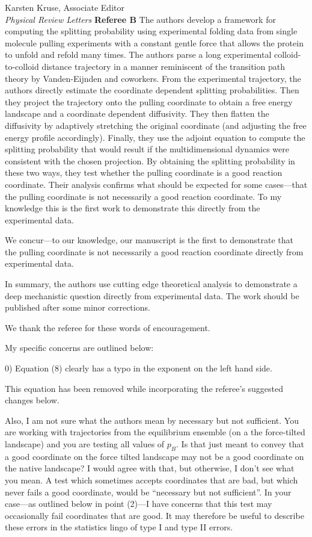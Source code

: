 \documentclass[ucb,qb3,10pt,fullfrom]{ucletter}
\begin{document}
\begin{letter}{Karsten Kruse, Associate Editor\\
\emph{Physical Review Letters}}
\color{magenta}
{\bf Referee B}
The authors develop a framework for computing the splitting
probability using experimental folding data from single molecule
pulling experiments with a constant gentle force that allows the
protein to unfold and refold many times. The authors parse a long
experimental colloid-to-colloid distance trajectory in a manner
reminiscent of the transition path theory by Vanden-Eijnden and
coworkers. From the experimental trajectory, the authors directly
estimate the coordinate dependent splitting probabilities. Then they
project the trajectory onto the pulling coordinate to obtain a free
energy landscape and a coordinate dependent diffusivity. They then
flatten the diffusivity by adaptively stretching the original
coordinate (and adjusting the free energy profile accordingly).
Finally, they use the adjoint equation to compute the splitting
probability that would result if the multidimensional dynamics were
consistent with the chosen projection. By obtaining the splitting
probability in these two ways, they test whether the pulling
coordinate is a good reaction coordinate. Their analysis confirms what
should be expected for some cases---that the pulling coordinate is not
necessarily a good reaction coordinate. To my knowledge this is the
first work to demonstrate this directly from the experimental data. 

\color{black}
We concur---to our knowledge, our manuscript is the first to demonstrate that the pulling coordinate is not necessarily a good reaction coordinate directly from experimental data.

\color{magenta}
In summary, the authors use cutting edge theoretical analysis to
demonstrate a deep mechanistic question directly from experimental
data. The work should be published after some minor corrections. 

\color{black}
We thank the referee for these words of encouragement.

\color{magenta}
My specific concerns are outlined below:

0) Equation (8) clearly has a typo in the exponent on the left hand
side. 

\color{black}
This equation has been removed while incorporating the referee's suggested changes below.

\color{magenta}
Also, I am not sure what the authors mean by necessary but not
sufficient. You are working with trajectories from the equilibrium
ensemble (on a the force-tilted landscape) and you are testing all
values of $p_B$. Is that just meant to convey that a good coordinate on
the force tilted landscape may not be a good coordinate on the native
landscape? I would agree with that, but otherwise, I don't see what
you mean. A test which sometimes accepts coordinates that are bad, but
which never fails a good coordinate, would be ``necessary but not
sufficient''. In your case---as outlined below in point (2)---I have
concerns that this test may occasionally fail coordinates that are
good. It may therefore be useful to describe these errors in the
statistics lingo of type I and type II errors.


\end{letter}
\end{document}
